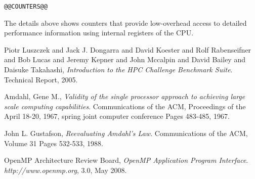 \documentclass[a4paper]{article}
\begin{document}
\begin{verbatim}
@@COUNTERS@@
\end{verbatim}

The details above shows counters that provide low-overhead access to detailed performance information using internal registers of the CPU.

\begin{thebibliography}{9}

  {Piotr Luszczek and Jack J. Dongarra and David Koester and Rolf Rabenseifner and Bob Lucas and Jeremy Kepner and John Mccalpin and David Bailey and Daisuke Takahashi},
  \emph{Introduction to the HPC Challenge Benchmark Suite}.
  Technical Report,
  2005.

  {Amdahl, Gene M.},
  \emph{Validity of the single processor approach to achieving large scale computing capabilities}.
  Communications of the ACM,
  {Proceedings of the April 18-20, 1967, spring joint computer conference Pages 483-485},
  1967.

  John L. Gustafson,
  \emph{Reevaluating Amdahl's Law}.
  Communications of the ACM,
  Volume 31 Pages 532-533,
  1988.

  OpenMP Architecture Review Board,
  \emph{OpenMP Application Program Interface}.
  {\it http://www.openmp.org},
  3.0,
  May 2008.

\end{thebibliography}
\end{document}
